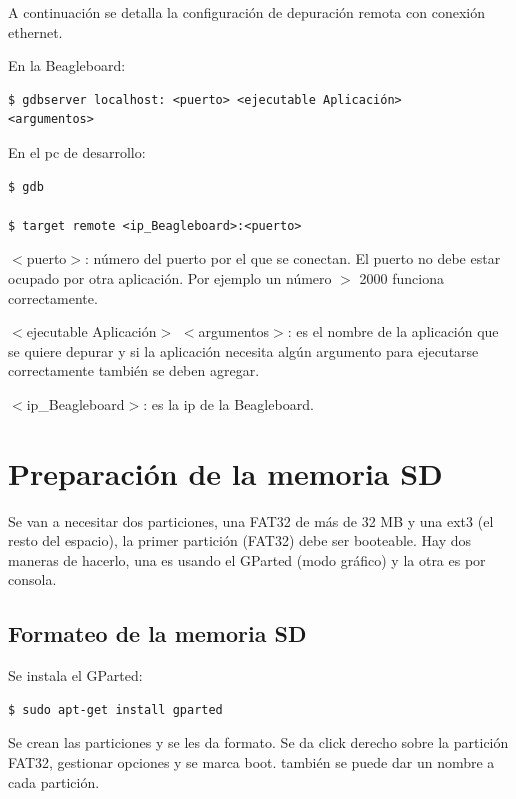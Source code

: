 A continuación se detalla la configuración de depuración remota con conexión ethernet.

\bigskip
En la Beagleboard:    

\begin{verbatim}           							
$ gdbserver localhost: <puerto> <ejecutable Aplicación> 
<argumentos>
\end{verbatim}

En el pc de desarrollo:

\begin{verbatim}
$ gdb

$ target remote <ip_Beagleboard>:<puerto>
\end{verbatim}

$<$puerto$>$: número del puerto por el que se conectan. El puerto no debe estar ocupado por otra aplicación. Por ejemplo un número $>$ 2000 funciona correctamente.

\bigskip
$<$ejecutable Aplicación$>$ $<$argumentos$>$: es el nombre de la aplicación que se quiere depurar y si la aplicación necesita algún argumento para ejecutarse correctamente también se deben agregar.

\bigskip
$<$ip\_Beagleboard$>$: es la ip de la Beagleboard.


\section{Preparación de la memoria SD}\label{sd_prep}

Se van a necesitar dos particiones, una FAT32 de más de 32 MB y una ext3 (el resto del espacio), la
primer partición (FAT32) debe ser booteable.
Hay dos maneras de hacerlo, una es usando el GParted (modo gráfico) y la otra es por consola.

\subsection{Formateo de la memoria SD}


Se instala el GParted:

\begin{verbatim}
$ sudo apt-get install gparted
\end{verbatim}

Se crean las particiones y se les da formato.
Se da click derecho sobre la partición FAT32, gestionar opciones y se marca boot. también se puede dar un nombre a cada partición.


